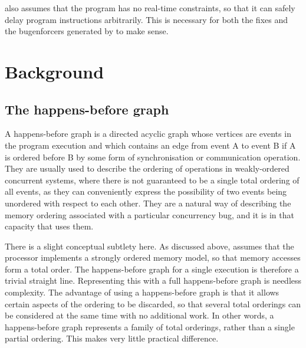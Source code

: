{\Technique} also assumes that the program has no real-time
constraints, so that it can safely delay program instructions
arbitrarily.  This is necessary for both the fixes and the
\glspl{bugenforcer} generated by {\technique} to make sense.

\section{Background}


\subsection{The happens-before graph}

A happens-before graph\needCite{} is a directed acyclic graph whose
vertices are events in the program execution and which contains an
edge from event A to event B if A is ordered before B by some form of
synchronisation or communication operation.  They are usually used to
describe the ordering of operations in weakly-ordered concurrent
systems, where there is not guaranteed to be a single total ordering
of all events, as they can conveniently express the possibility of two
events being unordered with respect to each other.  They are a natural
way of describing the memory ordering associated with a particular
concurrency bug, and it is in that capacity that {\technique} uses
them.

There is a slight conceptual subtlety here.  As discussed above,
{\technique} assumes that the processor implements a strongly ordered
memory model, so that memory accesses form a total order.  The
happens-before graph for a single execution is therefore a trivial
straight line.  Representing this with a full happens-before graph is
needless complexity.  The advantage of using a happens-before graph is
that it allows certain aspects of the ordering to be discarded, so
that several total orderings can be considered at the same time with
no additional work.  In other words, a {\technique} happens-before
graph represents a family of total orderings, rather than a single
partial ordering.  This makes very little practical difference.


